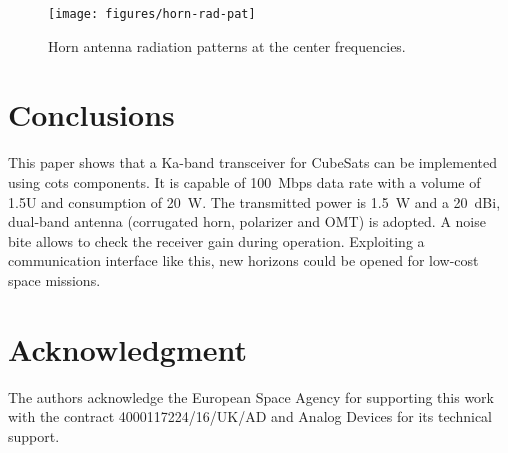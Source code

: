 \documentclass[conference,10pt,a4paper]{IEEEtran}%
\begin{document}

\begin{figure}[tb]
	\centering
	\texttt{[image: figures/horn-rad-pat]}
	\caption{Horn antenna radiation patterns at the center frequencies.}
	\label{fig:rad-pat}
\end{figure}

\section{Conclusions}
\label{sec:con}
This paper shows that a Ka-band transceiver
for CubeSats can be implemented using \ac{cots} components.
It is capable of \SI{100}{Mbps} data rate with a volume of 1.5U and consumption of \SI{20}{W}.
The transmitted power is \SI{1.5}{W} and a \SI{20}{dBi}, dual-band antenna (corrugated horn, polarizer and OMT) is adopted.
A noise \ac{bite} allows to check the receiver gain during operation.
Exploiting a communication interface like this, new horizons could be opened for low-cost space missions.

\section*{Acknowledgment}
The authors acknowledge the European Space Agency for supporting this work with the contract 4000117224/16/UK/AD and Analog Devices for its technical support.



\end{document}
